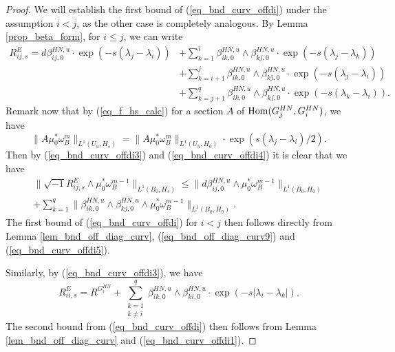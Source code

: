 \documentclass[12pt]{article}
\numberwithin{equation}{section}
\theoremstyle{theorem}
\theoremstyle{definition}
\theoremstyle{remark}
\newcommand{\imun} {\sqrt{-1}}
\begin{document}
	\begin{proof} 
		We will establish the first bound of (\ref{eq_bnd_curv_offdi}) under the assumption $i < j$, as the other case is completely analogous.
		By Lemma \ref{prop_beta_form}, for $i \leq j$, we can write
		\begin{equation}\label{eq_bnd_curv_offdi3}
		\begin{aligned}
			R^E_{i j, s}
			=
			d \beta_{i j, 0}^{HN, u} \cdot \exp(- s (\lambda_j - \lambda_i))
			& +
			\sum_{k = 1}^i
			\beta_{i k, 0}^{HN, u} \wedge \beta_{k j, 0}^{HN, u}  \cdot \exp(- s (\lambda_j - \lambda_k))
			\\
			& +
			\sum_{k = i + 1}^j
			\beta_{i k, 0}^{HN, u} \wedge \beta_{k j, 0}^{HN, u}  \cdot \exp(- s (\lambda_j - \lambda_i))
			\\
			& +
			\sum_{k = j + 1}^q
			\beta_{i k, 0}^{HN, u} \wedge \beta_{k j, 0}^{HN, u}  \cdot \exp(- s (\lambda_k - \lambda_i)).
		\end{aligned}
		\end{equation}
		Remark now that by (\ref{eq_f_hs_calc}) for a section $A$ of ${\rm{Hom}}(G_j^{HN}, G_i^{HN})$, we have
		\begin{equation}\label{eq_bnd_curv_offdi4}
			\big\| 
			A \mu_0^* \omega_B^m
			\big\|_{L^1(U_u, H_s)}
			=
			\big\| 
			A \mu_0^* \omega_B^m
			\big\|_{L^1(U_u, H_0)}
			\cdot
			\exp(s (\lambda_j - \lambda_i) / 2).
		\end{equation}
		Then by (\ref{eq_bnd_curv_offdi3}) and (\ref{eq_bnd_curv_offdi4}) it is clear that we have
		\begin{multline}\label{eq_bnd_curv_offdi5}
			\big\| 
			\imun R^E_{i j, s} \wedge \mu_0^* \omega_B^{m - 1} 
			\big\|_{L^1(B_0, H_s)}
			\leq
			\big\| 
			d \beta_{i j, 0}^{HN, u} \wedge \mu_0^* \omega_B^{m - 1} 
			\big\|_{L^1(B_0, H_0)}
			\\
			+
			\sum_{k = 1}^q
			\big\| 
			\beta_{i k, 0}^{HN, u} \wedge \beta_{k j, 0}^{HN, u}  \wedge \mu_0^* \omega_B^{m - 1} 
			\big\|_{L^1(B_0, H_0)}.
		\end{multline}
		The first bound of (\ref{eq_bnd_curv_offdi}) for $i < j$ then follows directly from Lemma \ref{lem_bnd_off_diag_curv}, (\ref{eq_bnd_off_diag_curv9}) and (\ref{eq_bnd_curv_offdi5}). 
		\par 
		Similarly, by (\ref{eq_bnd_curv_offdi3}), we have
		\begin{equation}\label{eq_bnd_curv_offdi1}
			R^E_{i i, s}
			=
			R^{G_i^{HN}}
			+
			\sum_{\substack{k = 1 \\ k \neq i}}^q
			\beta_{i k, 0}^{HN, u} \wedge \beta_{k i, 0}^{HN, u}  \cdot \exp(- s |\lambda_i - \lambda_k|).
		\end{equation}
		The second bound from (\ref{eq_bnd_curv_offdi}) then follows from Lemma \ref{lem_bnd_off_diag_curv} and (\ref{eq_bnd_curv_offdi1}).
	\end{proof}
\end{document}
